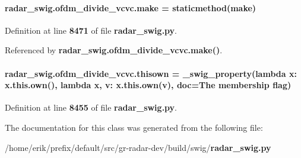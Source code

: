 \paragraph[{make}]{\setlength{\rightskip}{0pt plus 5cm}radar\+\_\+swig.\+ofdm\+\_\+divide\+\_\+vcvc.\+make = staticmethod(make)\hspace{0.3cm}{\ttfamily [static]}}\label{classradar__swig_1_1ofdm__divide__vcvc_ac3dd926958af903ce622260488ae3a74}


Definition at line {\bf 8471} of file {\bf radar\+\_\+swig.\+py}.



Referenced by {\bf radar\+\_\+swig.\+ofdm\+\_\+divide\+\_\+vcvc.\+make()}.

\paragraph[{thisown}]{\setlength{\rightskip}{0pt plus 5cm}radar\+\_\+swig.\+ofdm\+\_\+divide\+\_\+vcvc.\+thisown = {\bf \+\_\+swig\+\_\+property}(lambda x\+: x.\+this.\+own(), lambda {\bf x}, v\+: x.\+this.\+own(v), doc=\textquotesingle{}The membership flag\textquotesingle{})\hspace{0.3cm}{\ttfamily [static]}}\label{classradar__swig_1_1ofdm__divide__vcvc_ab51f24982d74ce23b40e0d49c60fbcf9}


Definition at line {\bf 8455} of file {\bf radar\+\_\+swig.\+py}.



The documentation for this class was generated from the following file\+:\begin{DoxyCompactItemize}
\item 
/home/erik/prefix/default/src/gr-\/radar-\/dev/build/swig/{\bf radar\+\_\+swig.\+py}\end{DoxyCompactItemize}
